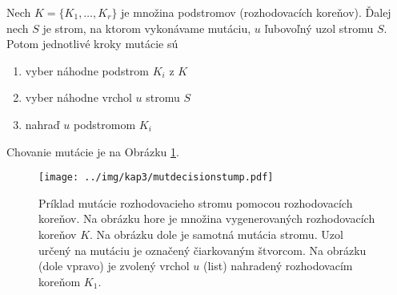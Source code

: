Nech $K=\{K_1,\ldots,K_r\}$ je množina podstromov (rozhodovacích koreňov). Ďalej nech $S$ je strom, na ktorom vykonávame mutáciu, $u$ ľubovoľný uzol stromu $S$. Potom jednotlivé kroky mutácie sú 
\begin{enumerate}
\item vyber náhodne podstrom $K_i$ z $K$
\item vyber náhodne vrchol $u$ stromu $S$
\item nahraď $u$ podstromom $K_i$
\end{enumerate}
Chovanie mutácie je na Obrázku \ref{fig:mutdecisionstump}.

\begin{figure}[h]
\centering
\centerline{\mbox{\texttt{[image: ../img/kap3/mutdecisionstump.pdf]}}}
\caption{Príklad mutácie rozhodovacieho stromu pomocou rozhodovacích koreňov. Na obrázku hore je množina vygenerovaných rozhodovacích koreňov $K$. Na obrázku dole je samotná mutácia stromu. Uzol určený na mutáciu je označený čiarkovaným štvorcom. Na obrázku (dole vpravo) je zvolený vrchol $u$ (list) nahradený rozhodovacím koreňom $K_1$. }\label{fig:mutdecisionstump}
\end{figure}